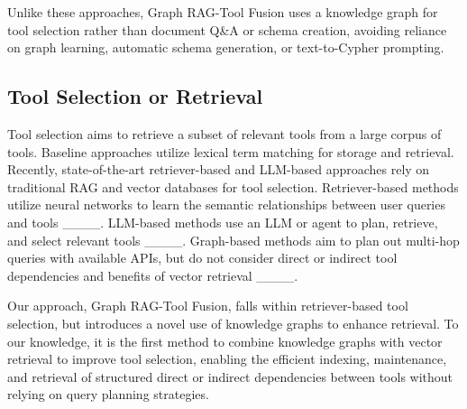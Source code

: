 Unlike these approaches, Graph RAG-Tool Fusion uses a knowledge graph for tool selection rather than document Q\&A or schema creation, avoiding reliance on graph learning, automatic schema generation, or text-to-Cypher prompting.

\subsection{Tool Selection or Retrieval}
Tool selection aims to retrieve a subset of relevant tools from a large corpus of tools. Baseline approaches utilize lexical term matching for storage and retrieval. Recently, state-of-the-art retriever-based and LLM-based approaches rely on traditional RAG and vector databases for tool selection. Retriever-based methods utilize neural networks to learn the semantic relationships between user queries and tools ____. LLM-based methods use an LLM or agent to plan, retrieve, and select relevant tools ____. Graph-based methods aim to plan out multi-hop queries with available APIs, but do not consider direct or indirect tool dependencies and benefits of vector retrieval ____.

Our approach, Graph RAG-Tool Fusion, falls within retriever-based tool selection, but introduces a novel use of knowledge graphs to enhance retrieval. To our knowledge, it is the first method to combine knowledge graphs with vector retrieval to improve tool selection, enabling the efficient indexing, maintenance, and retrieval of structured direct or indirect dependencies between tools without relying on query planning strategies.